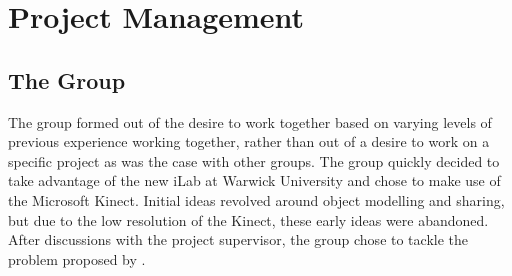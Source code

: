 \chapter{Project Management}
\label{project management}

\section{The Group}
The group formed out of the desire to work together based on varying levels of previous experience working together, rather than out of a desire to work on a specific project as was the case with other groups.
The group quickly decided to take advantage of the new iLab at Warwick University and chose to make use of the Microsoft Kinect.
Initial ideas revolved around object modelling and sharing, but due to the low resolution of the Kinect, these early ideas were abandoned.
After discussions with the project supervisor, the group chose to tackle the problem proposed by .\\

